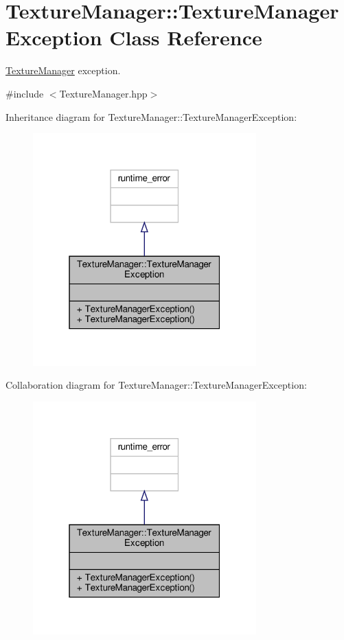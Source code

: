 \hypertarget{class_texture_manager_1_1_texture_manager_exception}{}\section{Texture\+Manager\+:\+:Texture\+Manager\+Exception Class Reference}
\label{class_texture_manager_1_1_texture_manager_exception}


\hyperlink{class_texture_manager}{Texture\+Manager} exception.  




{\ttfamily \#include $<$Texture\+Manager.\+hpp$>$}



Inheritance diagram for Texture\+Manager\+:\+:Texture\+Manager\+Exception\+:
\nopagebreak
\begin{figure}[H]
\begin{center}
\leavevmode
\includegraphics[width=244pt]{class_texture_manager_1_1_texture_manager_exception__inherit__graph}
\end{center}
\end{figure}


Collaboration diagram for Texture\+Manager\+:\+:Texture\+Manager\+Exception\+:
\nopagebreak
\begin{figure}[H]
\begin{center}
\leavevmode
\includegraphics[width=244pt]{class_texture_manager_1_1_texture_manager_exception__coll__graph}
\end{center}
\end{figure}
